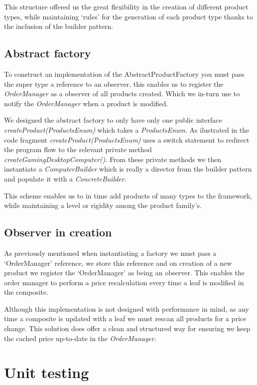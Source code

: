 \documentclass[pdftex,11pt,a4paper]{article}
\begin{document}
This structure offered us the great flexibility in the creation of different product types, while maintaining ‘rules’ for the generation of each product type thanks to the inclusion of the builder pattern.

\subsection{Abstract factory}

To construct an implementation of the AbstractProductFactory you must pass the super type a reference to an observer, this enables us to register the \emph{OrderManager} as a observer of all products created. Which we in-turn use to notify the \emph{OrderManager} when a product is modified.

We designed the abstract factory to only have only one public interface \emph{createProduct(ProductsEnum)} which takes a \emph{ProductsEnum}. As ilustrated in the code fragment \emph{createProduct(ProductsEnum)} uses a switch statement to redirect the program flow to the relevant private method \emph{createGamingDesktopComputer()}. From these private methods we then instantiate a \emph{ComputerBuilder} which is really a director from the builder pattern and populate it with a \emph{ConcreteBuilder}.

This scheme enables us to in time add products of many types to the framework, while maintaining a level or rigidity among the product family's.



\subsection{Observer in creation}
As previously mentioned when instantiating a factory we must pass a ‘OrderManager’ reference, we store this reference and on creation of a new product we register the ‘OrderManager’ as being an observer. This enables the order manager to perform a price recalculation every time a leaf is modified in the composite.

Although this implementation is not designed with performance in mind, as any time a composite is updated with a leaf we must rescan all products for a price change. This solution does offer a clean and structured way for ensuring we keep the cached price up-to-date in the \emph{OrderManager}.

\pagebreak

\section{Unit testing}
\end{document}
